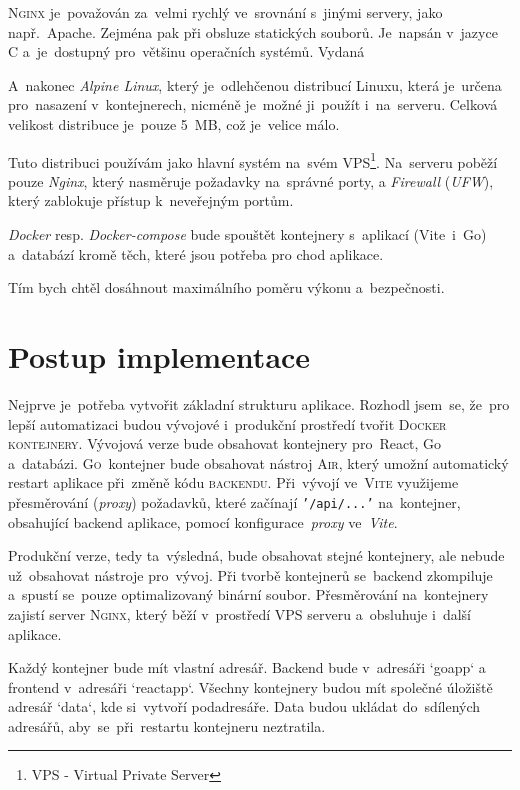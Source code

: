 \documentclass[14pt,a4paper]{article}
\begin{document}
            \textsc{Nginx} je~považován za~velmi rychlý ve~srovnání s~jinými servery, jako např.~Apache. Zejména pak při obsluze statických souborů. Je~napsán v~jazyce C a~je~dostupný pro~většinu operačních systémů. Vydaná  \cite{WhatNGINX}

            A~nakonec \emph{Alpine Linux}, který je~odlehčenou distribucí Linuxu, která je~určena pro~nasazení v~kontejnerech, nicméně je~možné ji~použít i~na~serveru. Celková velikost distribuce je~pouze 5~MB, což je~velice málo. 

            Tuto distribuci používám jako hlavní systém na~svém VPS\footnote{VPS - Virtual Private Server}.
            Na~serveru poběží pouze \emph{Nginx}, který nasměruje požadavky na~správné porty, a \emph{Firewall} (\emph{UFW}), který zablokuje přístup k~neveřejným portům.

            \emph{Docker} resp. \emph{Docker-compose} bude spouštět kontejnery s~aplikací (Vite~i~Go) a~databází
            kromě těch, které jsou potřeba pro chod aplikace.

            Tím bych chtěl dosáhnout maximálního poměru výkonu a~bezpečnosti.
	
	\section{Postup implementace}
        Nejprve je~potřeba vytvořit základní strukturu aplikace. Rozhodl jsem~se, že~pro lepší automatizaci budou vývojové i~produkční prostředí tvořit \textsc{Docker kontejnery}.
        Vývojová verze bude obsahovat kontejnery pro~React, Go a~databázi. \textsc{Go}~kontejner bude obsahovat nástroj \textsc{Air}, který umožní automatický restart aplikace při~změně kódu \textsc{backendu}. Při~vývojí ve~\textsc{Vite} využijeme přesměrování (\emph{proxy}) požadavků, které začínají \texttt{'/api/...'} na~kontejner, obsahující backend aplikace, pomocí konfigurace~\emph{proxy} ve~\emph{Vite}.

        Produkční verze, tedy ta~výsledná, bude obsahovat stejné kontejnery, ale nebude už~obsahovat nástroje pro~vývoj. Při tvorbě kontejnerů se~backend zkompiluje a~spustí se~pouze optimalizovaný binární soubor.
        Přesměrování na~kontejnery zajistí server \textsc{Nginx}, který běží v~prostředí VPS serveru a~obsluhuje i~další aplikace.

        Každý kontejner bude mít vlastní adresář. Backend bude v~adresáři `goapp` a frontend v~adresáři `reactapp`. Všechny kontejnery budou mít společné úložiště adresář `data`, kde si~vytvoří podadresáře. Data budou ukládat do~sdílených adresářů, aby~se~při~restartu kontejneru neztratila.
\end{document}
